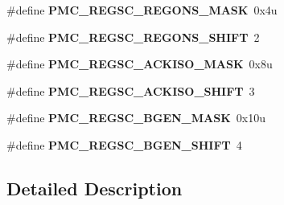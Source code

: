 \begin{DoxyCompactItemize}
\item 
\hypertarget{group___p_m_c___register___masks_gab830f2c82eef6d0db7caab8ee5689ba6}{}\#define {\bfseries P\+M\+C\+\_\+\+R\+E\+G\+S\+C\+\_\+\+R\+E\+G\+O\+N\+S\+\_\+\+M\+A\+S\+K}~0x4u\label{group___p_m_c___register___masks_gab830f2c82eef6d0db7caab8ee5689ba6}

\item 
\hypertarget{group___p_m_c___register___masks_ga06b4e6d970f2610a635c92bb1270541d}{}\#define {\bfseries P\+M\+C\+\_\+\+R\+E\+G\+S\+C\+\_\+\+R\+E\+G\+O\+N\+S\+\_\+\+S\+H\+I\+F\+T}~2\label{group___p_m_c___register___masks_ga06b4e6d970f2610a635c92bb1270541d}

\item 
\hypertarget{group___p_m_c___register___masks_ga35ced6f0f133b2d5892bdcba3e0b2832}{}\#define {\bfseries P\+M\+C\+\_\+\+R\+E\+G\+S\+C\+\_\+\+A\+C\+K\+I\+S\+O\+\_\+\+M\+A\+S\+K}~0x8u\label{group___p_m_c___register___masks_ga35ced6f0f133b2d5892bdcba3e0b2832}

\item 
\hypertarget{group___p_m_c___register___masks_gad2b9b6ce6aa455e8607fd3c2d1647544}{}\#define {\bfseries P\+M\+C\+\_\+\+R\+E\+G\+S\+C\+\_\+\+A\+C\+K\+I\+S\+O\+\_\+\+S\+H\+I\+F\+T}~3\label{group___p_m_c___register___masks_gad2b9b6ce6aa455e8607fd3c2d1647544}

\item 
\hypertarget{group___p_m_c___register___masks_ga7e1520a56f4d2675018d5efaa9492f19}{}\#define {\bfseries P\+M\+C\+\_\+\+R\+E\+G\+S\+C\+\_\+\+B\+G\+E\+N\+\_\+\+M\+A\+S\+K}~0x10u\label{group___p_m_c___register___masks_ga7e1520a56f4d2675018d5efaa9492f19}

\item 
\hypertarget{group___p_m_c___register___masks_gab43d258e6864ee3a7a728de1d720f6fe}{}\#define {\bfseries P\+M\+C\+\_\+\+R\+E\+G\+S\+C\+\_\+\+B\+G\+E\+N\+\_\+\+S\+H\+I\+F\+T}~4\label{group___p_m_c___register___masks_gab43d258e6864ee3a7a728de1d720f6fe}

\end{DoxyCompactItemize}


\subsection{Detailed Description}
